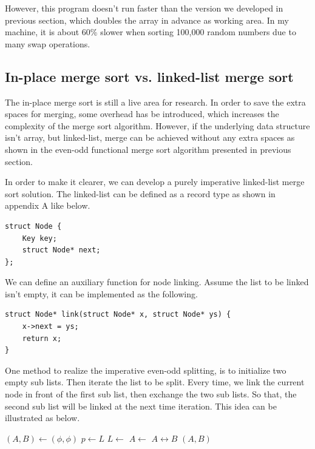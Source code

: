\documentclass[b5paper]{article}
\begin{document}
However, this program doesn't run faster than the version we developed in previous section, which doubles
the array in advance as working area. In my machine, it is about 60\% slower when sorting 100,000 random
numbers due to many swap operations.

\subsection{In-place merge sort vs. linked-list merge sort}
The in-place merge sort is still a live area for research. In order to save the extra spaces for merging,
some overhead has be introduced, which increases the complexity of the merge sort algorithm. However, if
the underlying data structure isn't array, but linked-list, merge can be achieved without any extra spaces
as shown in the even-odd functional merge sort algorithm presented in previous section.

In order to make it clearer, we can develop a purely imperative linked-list merge sort solution.
The linked-list can be defined as a record type as shown in appendix A like below.

\lstset{language=C}
\begin{lstlisting}
struct Node {
    Key key;
    struct Node* next;
};
\end{lstlisting}

We can define an auxiliary function for node linking. Assume the list to be linked isn't empty, it
can be implemented as the following.

\lstset{language=C}
\begin{lstlisting}
struct Node* link(struct Node* x, struct Node* ys) {
    x->next = ys;
    return x;
}
\end{lstlisting}

One method to realize the imperative even-odd splitting, is to initialize two empty sub lists.
Then iterate the list to be split. Every time, we link the current node in front of the
first sub list, then exchange the two sub lists. So that, the second sub list will be linked
at the next time iteration. This idea can be illustrated as below.

\begin{algorithmic}[1]
  \State $(A, B) \gets (\phi, \phi)$
    \State $p \gets L$
    \State $L \gets $ 
    \State $A \gets $ 
    \State {} $A \leftrightarrow B$
  \EndWhile
  \State \Return $(A, B)$
\EndFunction
\end{algorithmic}
\end{document}
